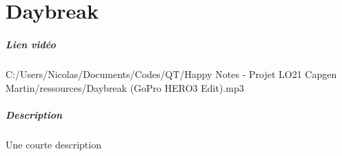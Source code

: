 \documentclass[a4paper,11pt]{report}
\begin{document}
\chapter{Daybreak}
\paragraph{Lien vidéo}C:/Users/Nicolas/Documents/Codes/QT/Happy Notes - Projet LO21 Capgen Martin/ressources/Daybreak (GoPro HERO3 Edit).mp3
\paragraph{Description}Une courte description
\end{document}
